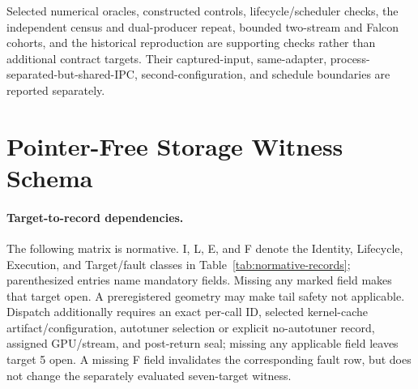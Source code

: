 \documentclass{article}
\begin{document}
Selected numerical oracles, constructed controls, lifecycle/scheduler checks,
the independent census and dual-producer repeat, bounded two-stream and Falcon
cohorts, and the historical reproduction are supporting checks rather than
additional contract targets.  Their captured-input, same-adapter,
process-separated-but-shared-IPC, second-configuration, and schedule boundaries
are reported separately.

\section{Pointer-Free Storage Witness Schema}
\label{app:storage-schema}

\paragraph{Target-to-record dependencies.}
The following matrix is normative.  I, L, E, and F denote the Identity,
Lifecycle, Execution, and Target/fault classes in Table~\ref{tab:normative-records};
parenthesized entries name mandatory fields.  Missing any marked field makes
that target open.  A preregistered geometry may make tail safety not applicable.
Dispatch additionally requires an exact per-call ID, selected kernel-cache
artifact/configuration, autotuner selection or explicit no-autotuner record,
assigned GPU/stream, and post-return seal; missing any applicable field leaves
target 5 open.  A missing F field invalidates the corresponding fault row,
but does not change the separately evaluated seven-target witness.
\end{document}
